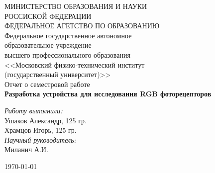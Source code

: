 \begin{titlepage}


\begin{center}
\large МИНИСТЕРСТВО ОБРАЗОВАНИЯ И НАУКИ\\
\large РОССИСКОЙ ФЕДЕРАЦИИ \\
\large ФЕДЕРАЛЬНОЕ АГЕТСТВО ПО ОБРАЗОВАНИЮ\\
\large Федеральное государственное автономное\\
\large образовательное учреждение\\
\large высшего профессионального образования\\
\large <<Московский физико-технический институт\\
\large (государственный университет)>>\\[5.0cm]

{ \huge {\rm Отчет о семестровой работе} \\
\textbf{Разработка устройства для исследования RGB фоторецепторов} 
\\[4.4cm] }
\end{center}
\begin{flushright} 
\large
\emph{Работу выполнили:} \\
Ушаков Александр, 125 гр. \\
Храмцов Игорь, 125 гр. \\
\emph{Научный руководитель:} \\
Миланич А.И.
\end{flushright}
\vfill
\begin{center}
{\large \today}
\end{center}
\thispagestyle{empty}
\end{titlepage}